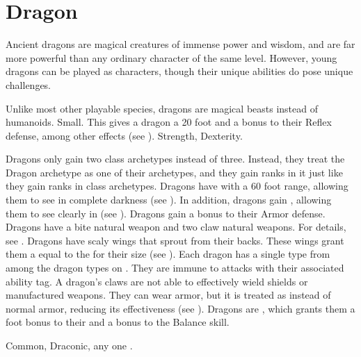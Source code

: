 \section{Dragon}
  Ancient dragons are magical creatures of immense power and wisdom, and are far more powerful than any ordinary character of the same level.
  However, young dragons can be played as characters, though their unique abilities do pose unique challenges.

   Unlike most other playable species, dragons are magical beasts instead of humanoids.
   Small. This gives a dragon a 20 foot  and a  bonus to their Reflex defense, among other effects (see ).
    Strength,  Dexterity.
  \begin{itemize}
     Dragons only gain two class archetypes instead of three.
      Instead, they treat the Dragon archetype as one of their archetypes, and they gain ranks in it just like they gain ranks in class archetypes.
     Dragons have  with a 60 foot range, allowing them to see in complete darkness (see ).
      In addition, dragons gain , allowing them to see clearly in  (see ).
     Dragons gain a  bonus to their Armor defense.
     Dragons have a bite natural weapon and two claw natural weapons.
      For details, see .
     Dragons have scaly wings that sprout from their backs.
      These wings grant them a  equal to the  for their size (see ).
     Each dragon has a single type from among the dragon types on .
      They are immune to attacks with their associated ability tag.
     A dragon's claws are not able to effectively wield shields or manufactured weapons.
      They can wear armor, but it is treated as  instead of normal armor, reducing its effectiveness (see ).
     Dragons are , which grants them a  foot bonus to their  and a  bonus to the Balance skill.
  \end{itemize}
   Common, Draconic, any one .


